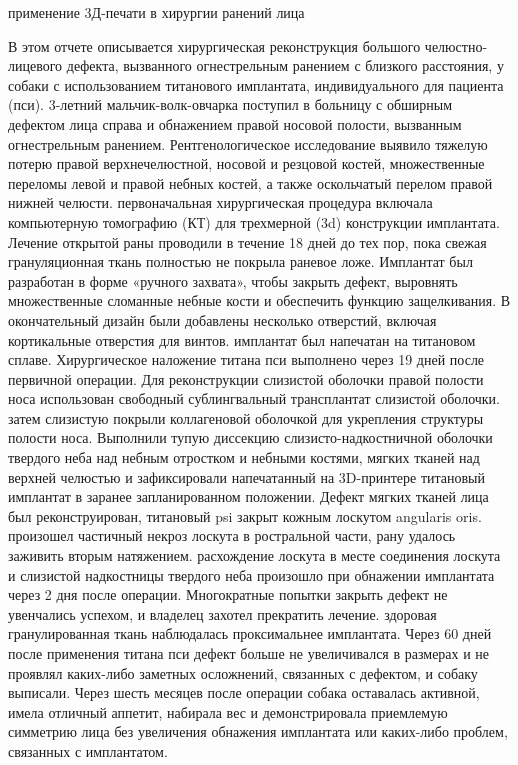 применение 3Д-печати в хирургии ранений лица

В этом отчете описывается хирургическая реконструкция большого челюстно-лицевого
дефекта, вызванного огнестрельным ранением с близкого расстояния, у собаки с
использованием титанового имплантата, индивидуального для пациента (пси).
3-летний мальчик-волк-овчарка поступил в больницу с обширным дефектом лица
справа и обнажением правой носовой полости, вызванным огнестрельным ранением.
Рентгенологическое исследование выявило тяжелую потерю правой верхнечелюстной,
носовой и резцовой костей, множественные переломы левой и правой небных костей,
а также оскольчатый перелом правой нижней челюсти. первоначальная хирургическая
процедура включала компьютерную томографию (КТ) для трехмерной (3d) конструкции
имплантата. Лечение открытой раны проводили в течение 18 дней до тех пор, пока
свежая грануляционная ткань полностью не покрыла раневое ложе. Имплантат был
разработан в форме «ручного захвата», чтобы закрыть дефект, выровнять
множественные сломанные небные кости и обеспечить функцию защелкивания. В
окончательный дизайн были добавлены несколько отверстий, включая кортикальные
отверстия для винтов. имплантат был напечатан на титановом сплаве. Хирургическое
наложение титана пси выполнено через 19 дней после первичной операции. Для
реконструкции слизистой оболочки правой полости носа использован свободный
сублингвальный трансплантат слизистой оболочки. затем слизистую покрыли
коллагеновой оболочкой для укрепления структуры полости носа. Выполнили тупую
диссекцию слизисто-надкостничной оболочки твердого неба над небным отростком и
небными костями, мягких тканей над верхней челюстью и зафиксировали напечатанный
на 3D-принтере титановый имплантат в заранее запланированном положении. Дефект
мягких тканей лица был реконструирован, титановый psi закрыт кожным лоскутом
angularis oris. произошел частичный некроз лоскута в ростральной части, рану
удалось заживить вторым натяжением. расхождение лоскута в месте соединения
лоскута и слизистой надкостницы твердого неба произошло при обнажении имплантата
через 2 дня после операции. Многократные попытки закрыть дефект не увенчались
успехом, и владелец захотел прекратить лечение. здоровая гранулированная ткань
наблюдалась проксимальнее имплантата. Через 60 дней после применения титана пси
дефект больше не увеличивался в размерах и не проявлял каких-либо заметных
осложнений, связанных с дефектом, и собаку выписали. Через шесть месяцев после
операции собака оставалась активной, имела отличный аппетит, набирала вес и
демонстрировала приемлемую симметрию лица без увеличения обнажения имплантата
или каких-либо проблем, связанных с имплантатом.\cite{36439351}

